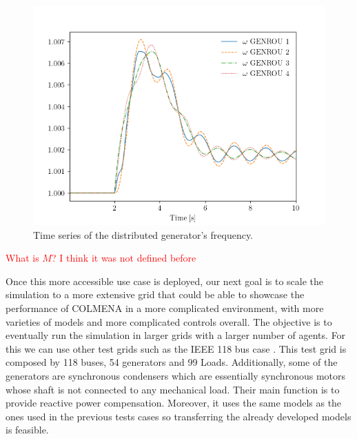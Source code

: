 \documentclass{article}
\begin{document}
\begin{figure}[h]  %
    \centering
    \includegraphics[width=1\textwidth]{pictures/plot.png}

    \caption{Time series of the distributed generator's frequency.}
    \label{fig:sample_figure2}
\end{figure}

\textcolor{red}{What is $M$? I think it was not defined before}

Once this more accessible use case is deployed, our next goal is to scale the simulation to a more extensive grid that could be able to showcase the performance of COLMENA in a more complicated environment, with more varieties of models and more complicated controls overall. The objective is to eventually run the simulation in larger grids with a larger number of agents. For this we can use other test grids such as the IEEE 118 bus case \cite{grids:ieee118}. This test grid is composed by 118 buses, 54 generators and 99 Loads. Additionally, some of the generators are synchronous condensers which are essentially synchronous motors whose shaft is not connected to any mechanical load. Their main function is to provide reactive power compensation. Moreover, it uses the same models as the ones used in the previous tests cases so transferring the already developed models is feasible.
\end{document}

